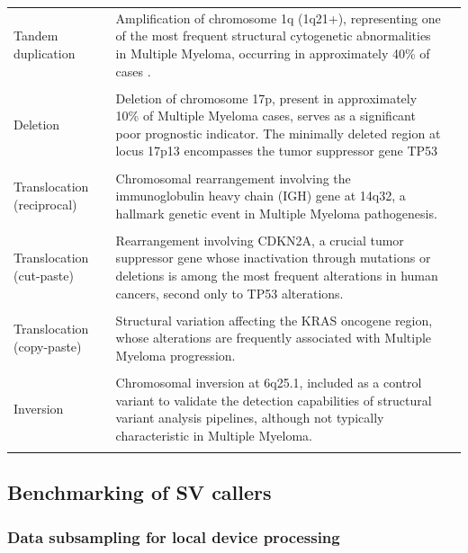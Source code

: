 \begin{longtable}{>{\RaggedRight\arraybackslash}p{2.5cm} 
                  >{\RaggedRight\arraybackslash}p{10.5cm} 
                  >{\RaggedLeft\arraybackslash}p{1.75cm}}
    \\
    Tandem \mbox{duplication}         & Amplification of chromosome 1q (1q21+), representing one of the most frequent structural cytogenetic abnormalities in Multiple Myeloma, occurring in approximately 40\% of cases .     & 10152930 \\
    \\
    Deletion                          & Deletion of chromosome 17p, present in approximately 10\% of Multiple Myeloma cases, serves as a significant poor prognostic indicator. The minimally deleted region at locus 17p13 encompasses the tumor suppressor gene TP53 & 234564 \\
    \\
    Translocation \mbox{(reciprocal)} & Chromosomal rearrangement involving the immunoglobulin heavy chain (IGH) gene at 14q32, a hallmark genetic event in Multiple Myeloma pathogenesis.                                                  & 1502367  \\
    \\
    Translocation \mbox{(cut-paste)}  & Rearrangement involving CDKN2A, a crucial tumor suppressor gene whose inactivation through mutations or deletions is among the most frequent alterations in human cancers, second only to TP53 alterations. & 31271 \\
    \\
    Translocation \mbox{(copy-paste)} & Structural variation affecting the KRAS oncogene region, whose alterations are frequently associated with Multiple Myeloma progression.  & 45683 \\
    \\
    Inversion                         & Chromosomal inversion at 6q25.1, included as a control variant to validate the detection capabilities of structural variant analysis pipelines, although not typically characteristic in Multiple Myeloma.          & 3600001  \\
    \\

\end{longtable}
\endgroup

\newpage 

\subsection{Benchmarking of SV callers}

\subsubsection{Data subsampling for local device processing}

